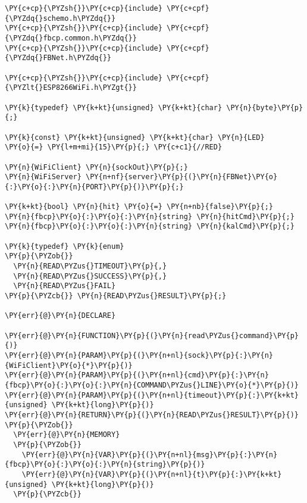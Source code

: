 \begin{Verbatim}[commandchars=\\\{\}]
\PY{c+cp}{\PYZsh{}}\PY{c+cp}{include} \PY{c+cpf}{\PYZdq{}schemo.h\PYZdq{}}
\PY{c+cp}{\PYZsh{}}\PY{c+cp}{include} \PY{c+cpf}{\PYZdq{}fbcp.common.h\PYZdq{}}
\PY{c+cp}{\PYZsh{}}\PY{c+cp}{include} \PY{c+cpf}{\PYZdq{}FBNet.h\PYZdq{}}

\PY{c+cp}{\PYZsh{}}\PY{c+cp}{include} \PY{c+cpf}{\PYZlt{}ESP8266WiFi.h\PYZgt{}}

\PY{k}{typedef} \PY{k+kt}{unsigned} \PY{k+kt}{char} \PY{n}{byte}\PY{p}{;}

\PY{k}{const} \PY{k+kt}{unsigned} \PY{k+kt}{char} \PY{n}{LED}     \PY{o}{=} \PY{l+m+mi}{15}\PY{p}{;} \PY{c+c1}{//RED}

\PY{n}{WiFiClient} \PY{n}{sockOut}\PY{p}{;}
\PY{n}{WiFiServer} \PY{n+nf}{server}\PY{p}{(}\PY{n}{FBNet}\PY{o}{:}\PY{o}{:}\PY{n}{PORT}\PY{p}{)}\PY{p}{;}

\PY{k+kt}{bool} \PY{n}{hit} \PY{o}{=} \PY{n+nb}{false}\PY{p}{;}
\PY{n}{fbcp}\PY{o}{:}\PY{o}{:}\PY{n}{string} \PY{n}{hitCmd}\PY{p}{;}
\PY{n}{fbcp}\PY{o}{:}\PY{o}{:}\PY{n}{string} \PY{n}{kalCmd}\PY{p}{;}

\PY{k}{typedef} \PY{k}{enum}
\PY{p}{\PYZob{}}
  \PY{n}{READ\PYZus{}TIMEOUT}\PY{p}{,}
  \PY{n}{READ\PYZus{}SUCCESS}\PY{p}{,}
  \PY{n}{READ\PYZus{}FAIL}
\PY{p}{\PYZcb{}} \PY{n}{READ\PYZus{}RESULT}\PY{p}{;}

\PY{err}{@}\PY{n}{DECLARE}

\PY{err}{@}\PY{n}{FUNCTION}\PY{p}{(}\PY{n}{read\PYZus{}command}\PY{p}{)}
\PY{err}{@}\PY{n}{PARAM}\PY{p}{(}\PY{n+nl}{sock}\PY{p}{:}\PY{n}{WiFiClient}\PY{o}{*}\PY{p}{)}
\PY{err}{@}\PY{n}{PARAM}\PY{p}{(}\PY{n+nl}{cmd}\PY{p}{:}\PY{n}{fbcp}\PY{o}{:}\PY{o}{:}\PY{n}{COMMAND\PYZus{}LINE}\PY{o}{*}\PY{p}{)}
\PY{err}{@}\PY{n}{PARAM}\PY{p}{(}\PY{n+nl}{timeout}\PY{p}{:}\PY{k+kt}{unsigned} \PY{k+kt}{long}\PY{p}{)}
\PY{err}{@}\PY{n}{RETURN}\PY{p}{(}\PY{n}{READ\PYZus{}RESULT}\PY{p}{)}
\PY{p}{\PYZob{}}
  \PY{err}{@}\PY{n}{MEMORY}
  \PY{p}{\PYZob{}}
    \PY{err}{@}\PY{n}{VAR}\PY{p}{(}\PY{n+nl}{msg}\PY{p}{:}\PY{n}{fbcp}\PY{o}{:}\PY{o}{:}\PY{n}{string}\PY{p}{)}
    \PY{err}{@}\PY{n}{VAR}\PY{p}{(}\PY{n+nl}{t}\PY{p}{:}\PY{k+kt}{unsigned} \PY{k+kt}{long}\PY{p}{)}
  \PY{p}{\PYZcb{}}  
  

\end{Verbatim}
